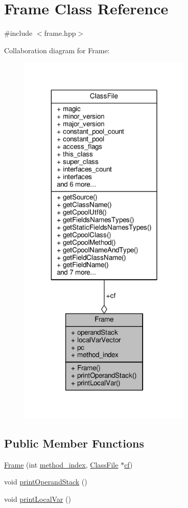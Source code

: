 \hypertarget{classFrame}{\section{Frame Class Reference}
\label{classFrame}
}


{\ttfamily \#include $<$frame.\+hpp$>$}



Collaboration diagram for Frame\+:\nopagebreak
\begin{figure}[H]
\begin{center}
\leavevmode
\includegraphics[width=234pt]{classFrame__coll__graph}
\end{center}
\end{figure}
\subsection*{Public Member Functions}
\begin{DoxyCompactItemize}
\item 
\hyperlink{classFrame_a0a710d74c28a542687e64715300cb8fb}{Frame} (int \hyperlink{classFrame_a9a7eb96be80ac389517368b48f88e1f5}{method\+\_\+index}, \hyperlink{classClassFile}{Class\+File} $\ast$\hyperlink{classFrame_a1adaa34d477660f1e9d45904576eacf2}{cf})
\item 
void \hyperlink{classFrame_a58199d48ff5d3b2c86aea6f79a8ccf10}{print\+Operand\+Stack} ()
\item 
void \hyperlink{classFrame_ab34a9033d268d94f205721b63101b047}{print\+Local\+Var} ()
\end{DoxyCompactItemize}

